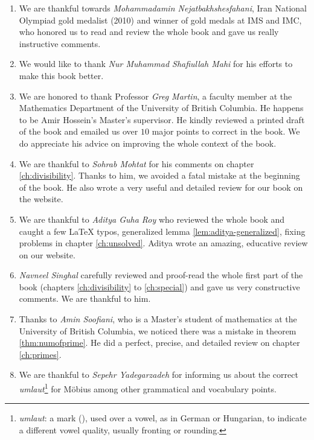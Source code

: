 \documentclass[leqno,12pt]{book}
\begin{document}
\begin{enumerate}
		\item We are thankful towards \textit{Mohammadamin Nejatbakhshesfahani}, Iran National Olympiad gold medalist (2010) and winner of gold medals at IMS and IMC, who honored us to read and review the whole book and gave us really instructive comments.

		\item We would like to thank \textit{Nur Muhammad Shafiullah Mahi} for his efforts to make this book better.

		\item We are honored to thank Professor \textit{Greg Martin}, a faculty member at the Mathematics Department of the University of British Columbia. He happens to be Amir Hossein's Master's supervisor. He kindly reviewed a printed draft of the book and emailed us over $10$ major points to correct in the book. We do appreciate his advice on improving the whole context of the book.

		\item We are thankful to \textit{Sohrab Mohtat} for his comments on chapter \ref{ch:divisibility}. Thanks to him, we avoided a fatal mistake at the beginning of the book. He also wrote a very useful and detailed review for our book on the website.

		\item We are thankful to \textit{Aditya Guha Roy} who reviewed the whole book and caught a few LaTeX typos, generalized lemma \eqref{lem:aditya-generalized}, fixing problems in chapter \ref{ch:unsolved}. Aditya wrote an amazing, educative review on our website.
		\item \textit{Navneel Singhal} carefully reviewed and proof-read the whole first part of the book (chapters \ref{ch:divisibility} to \ref{ch:special}) and gave us very constructive comments. We are thankful to him.

		\item Thanks to \textit{Amin Soofiani}, who is a Master's student of mathematics at the University of British Columbia, we noticed there was a mistake in theorem \eqref{thm:numofprime}. He did a perfect, precise, and detailed review on chapter \ref{ch:primes}.

		\item We are thankful to \textit{Sepehr Yadegarzadeh} for informing us about the correct \textit{umlaut}\footnote{\textit{umlaut}: a mark (\textacutedbl), used over a vowel, as in German or Hungarian, to indicate a different vowel quality, usually fronting or rounding.} for M\"{o}bius among other grammatical and vocabulary points.
	\end{enumerate}
\end{document}
